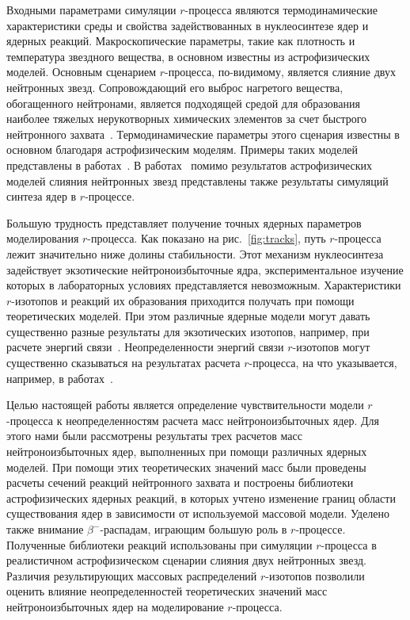 Входными параметрами симуляции $r$-процесса являются термодинамические характеристики среды и свойства задействованных в нуклеосинтезе ядер и ядерных реакций. Макроскопические параметры, такие как плотность и температура звездного вещества, в основном известны из астрофизических моделей. Основным сценарием $r$-процесса, по-видимому, является слияние двух нейтронных звезд. Сопровождающий его выброс нагретого вещества, обогащенного нейтронами, является подходящей средой для образования наиболее тяжелых нерукотворных химических элементов за счет быстрого нейтронного захвата~\cite{theilemann2017}. Термодинамические параметры этого сценария известны в основном благодаря астрофизическим моделям. Примеры таких моделей представлены в работах~\cite{rosswog1999,rosswog2013}. В работах~\cite{korobkin2012,rosswog2014,kullman2021} помимо результатов астрофизических моделей слияния нейтронных звезд представлены также результаты симуляций синтеза ядер в $r$-процессе.

Большую трудность представляет получение точных ядерных параметров моделирования $r$-процесса. Как показано на рис.~\ref{fig:tracks}, путь $r$-процесса лежит значительно ниже долины стабильности. Этот механизм нуклеосинтеза задействует экзотические нейтроноизбыточные ядра, экспериментальное изучение которых в лабораторных условиях представляется невозможным. Характеристики $r$-изотопов и реакций их образования приходится получать при помощи теоретических моделей. При этом различные ядерные модели могут давать существенно разные результаты для экзотических изотопов, например, при расчете энергий связи~\cite{sobiczewski2018}. Неопределенности энергий связи $r$-изотопов могут существенно сказываться на результатах расчета $r$-процесса, на что указывается, например, в работах~\cite{goriely2001,brett2012}.

Целью настоящей работы является определение чувствительности модели $r$-процесса к неопределенностям расчета масс нейтроноизбыточных ядер. Для этого нами были рассмотрены результаты трех расчетов масс нейтроноизбыточных ядер, выполненных при помощи различных ядерных моделей. При помощи этих теоретических значений масс были проведены расчеты сечений реакций нейтронного захвата и построены библиотеки астрофизических ядерных реакций, в которых учтено изменение границ области существования ядер в зависимости от используемой массовой модели. Уделено также внимание $\beta^-$-распадам, играющим большую роль в $r$-процессе. Полученные библиотеки реакций использованы при симуляции $r$-процесса в реалистичном астрофизическом сценарии слияния двух нейтронных звезд. Различия результирующих массовых распределений $r$-изотопов позволили оценить влияние неопределенностей теоретических значений масс нейтроноизбыточных ядер на моделирование $r$-процесса.
